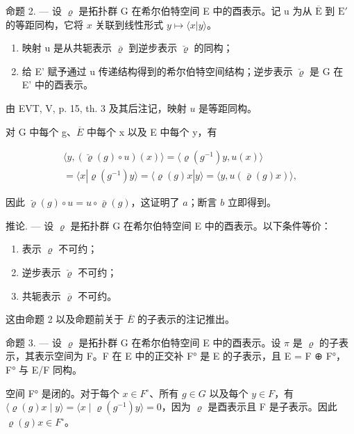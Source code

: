 命题 2. --- 设 \(\varrho\) 是拓扑群 G 在希尔伯特空间 E 中的酉表示。记 u 为从 \(\overline{\mathrm{E}}\) 到 \(\mathrm{E}'\) 的等距同构，它将 \(x\) 关联到线性形式 \(y\mapsto \langle x|y\rangle\)。

\begin{enumerate}
\def\labelenumi{\alph{enumi})}
\item
  映射 u 是从共轭表示 \(\overline{\varrho}\) 到逆步表示 \(\breve{\varrho}\) 的同构；
\item
  给 E' 赋予通过 u 传递结构得到的希尔伯特空间结构；逆步表示 \(\breve{\varrho}\) 是 G 在 E' 中的酉表示。
\end{enumerate}

由 EVT, V, p. 15, th. 3 及其后注记，映射 \(u\) 是等距同构。

对 G 中每个 g、\(\overline{E}\) 中每个 x 以及 E 中每个 y，有

\[
\begin{array}{c} \langle y, (\breve {\varrho} (g) \circ u) (x) \rangle = \langle \varrho (g ^ {- 1}) y, u (x) \rangle \\ = \langle x | \varrho (g ^ {- 1}) y \rangle = \langle \varrho (g) x | y \rangle = \langle y, u (\overline {{\varrho}} (g) x) \rangle , \end{array}
\]

因此 \(\breve{\varrho}(g) \circ u = u \circ \overline{\varrho}(g)\)，这证明了 \(a\)；断言 \(b\) 立即得到。

推论. --- 设 \(\varrho\) 是拓扑群 G 在希尔伯特空间 E 中的酉表示。以下条件等价：

\begin{enumerate}
\def\labelenumi{(\roman{enumi})}
\item
  表示 \(\varrho\) 不可约；
\item
  逆步表示 \(\breve{\varrho}\) 不可约；
\item
  共轭表示 \(\overline{\varrho}\) 不可约。
\end{enumerate}

这由命题 2 以及命题前关于 \(\overline{E}\) 的子表示的注记推出。

命题 3. --- 设 \(\varrho\) 是拓扑群 G 在希尔伯特空间 E 中的酉表示。设 \(\pi\) 是 \(\varrho\) 的子表示，其表示空间为 F。F 在 E 中的正交补 F° 是 E 的子表示，且 E = F ⊕ F°，F° 与 E/F 同构。

空间 F° 是闭的。对于每个 \(x \in F^{\circ}\)、所有 \(g \in G\) 以及每个 \(y \in F\)，有 \(\langle \varrho(g)x \mid y \rangle = \langle x \mid \varrho(g^{-1})y \rangle = 0\)，因为 \(\varrho\) 是酉表示且 F 是子表示。因此 \(\varrho(g)x \in F^{\circ}\)。

